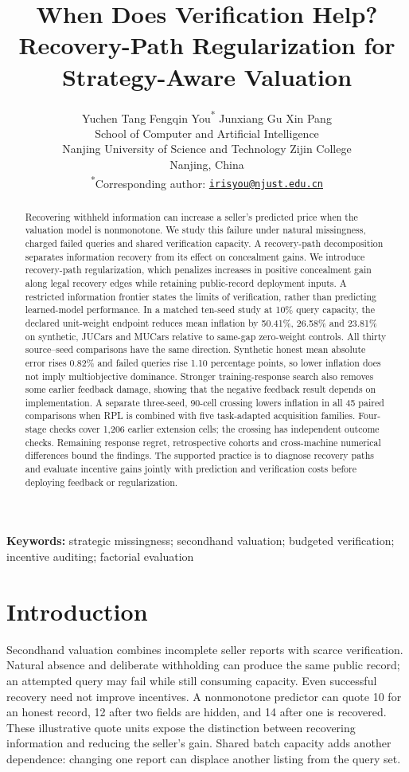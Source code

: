 \documentclass[11pt]{article}
\title{When Does Verification Help?\\Recovery-Path Regularization for Strategy-Aware Valuation}
\author{Yuchen Tang \quad Fengqin You\textsuperscript{*} \quad Junxiang Gu \quad Xin Pang\\[.5em]
\small School of Computer and Artificial Intelligence\\
\small Nanjing University of Science and Technology Zijin College\\
\small Nanjing, China\\[.4em]
\small \textsuperscript{*}Corresponding author: \href{mailto:irisyou@njust.edu.cn}{\texttt{irisyou@njust.edu.cn}}}
\date{}
\begin{document}
\maketitle
\begin{abstract}
Recovering withheld information can increase a seller's predicted price when the valuation model is nonmonotone. We study this failure under natural missingness, charged failed queries and shared verification capacity. A recovery-path decomposition separates information recovery from its effect on concealment gains. We introduce recovery-path regularization, which penalizes increases in positive concealment gain along legal recovery edges while retaining public-record deployment inputs. A restricted information frontier states the limits of verification, rather than predicting learned-model performance. In a matched ten-seed study at 10\% query capacity, the declared unit-weight endpoint reduces mean inflation by 50.41\%, 26.58\% and 23.81\% on synthetic, JUCars and MUCars relative to same-gap zero-weight controls. All thirty source--seed comparisons have the same direction. Synthetic honest mean absolute error rises 0.82\% and failed queries rise 1.10 percentage points, so lower inflation does not imply multiobjective dominance. Stronger training-response search also removes some earlier feedback damage, showing that the negative feedback result depends on implementation. A separate three-seed, 90-cell crossing lowers inflation in all 45 paired comparisons when RPL is combined with five task-adapted acquisition families. Four-stage checks cover 1,206 earlier extension cells; the crossing has independent outcome checks. Remaining response regret, retrospective cohorts and cross-machine numerical differences bound the findings. The supported practice is to diagnose recovery paths and evaluate incentive gains jointly with prediction and verification costs before deploying feedback or regularization.
\end{abstract}

\noindent\textbf{Keywords:} strategic missingness; secondhand valuation; budgeted verification; incentive auditing; factorial evaluation

\section{Introduction}\label{sec:introduction}
Secondhand valuation combines incomplete seller reports with scarce
verification. Natural absence and deliberate withholding can produce the same
public record; an attempted query may fail while still consuming capacity.
Even successful recovery need not improve incentives. A nonmonotone predictor
can quote 10 for an honest record, 12 after two fields are hidden, and 14 after
one is recovered. These illustrative quote units expose the distinction
between recovering information and reducing the seller's gain. Shared batch
capacity adds another dependence: changing one report can displace another
listing from the query set.
\end{document}

